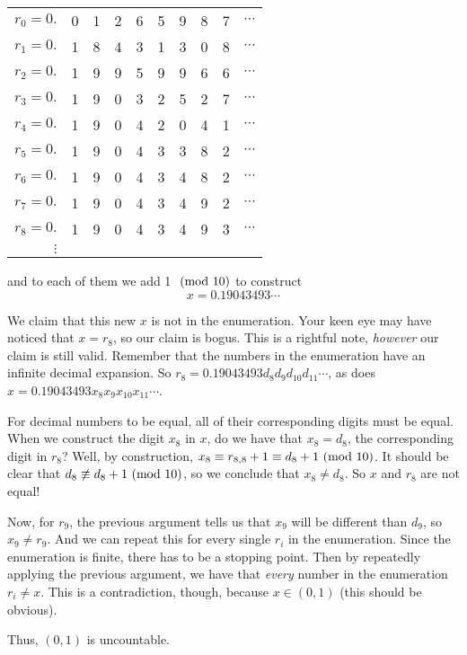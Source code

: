 \documentclass[main.tex]{subfiles}
\begin{document}
{	\begin{center}
		\begin{tabular}{rlllllllll}
			\(r_0 = 0.\) &\cellcolor{Melon}0 & 1 & 2 & 6 & 5 & 9 & 8 & 7 & \(\cdots\) \\
			\(r_1 = 0.\) & 1 &\cellcolor{Melon}8 & 4 & 3 & 1 & 3 & 0 & 8 & \(\cdots\) \\
			\(r_2 = 0.\) & 1 & 9 &\cellcolor{Melon}9 & 5 & 9 & 9 & 6 & 6 & \(\cdots\) \\
			\(r_3 = 0.\) & 1 & 9 & 0 &\cellcolor{Melon}3 & 2 & 5 & 2 & 7 & \(\cdots\) \\
			\(r_4 = 0.\) & 1 & 9 & 0 & 4 &\cellcolor{Melon}2 & 0 & 4 & 1 & \(\cdots\) \\
			\(r_5 = 0.\) & 1 & 9 & 0 & 4 & 3 &\cellcolor{Melon}3 & 8 & 2 & \(\cdots\) \\
			\(r_6 = 0.\) & 1 & 9 & 0 & 4 & 3 & 4 &\cellcolor{Melon}8 & 2 & \(\cdots\) \\
			\(r_7 = 0.\) & 1 & 9 & 0 & 4 & 3 & 4 & 9 &\cellcolor{Melon}2 & \(\cdots\) \\
			\(r_8 = 0.\) & 1 & 9 & 0 & 4 & 3 & 4 & 9 & 3 & \(\cdots\) \\
			\(\vdots\) \\
		\end{tabular}
	\end{center}
	
	and to each of them we add 1 \(\ (\mathrm{mod}\ 10)\) to construct \[x = 0.19043493\cdots\]
	
	We claim that this new \(x\) is not in the enumeration.
	Your keen eye may have noticed that \(x = r_8\), so our claim is bogus.
	This is a rightful note, \textit{however} our claim is still valid.
	Remember that the numbers in the enumeration have an infinite decimal expansion.
	So \(r_8 = 0.19043493 d_8 d_9 d_{10} d_{11} \cdots\), as does \(x = 0.19043493 x_8 x_9 x_{10} x_{11} \cdots\).
	
	For decimal numbers to be equal, all of their corresponding digits must be equal.
	When we construct the digit \(x_8\) in \(x\), do we have that \(x_8 = d_8\), the corresponding digit in \(r_8\)?
	Well, by construction, \(x_8 \equiv r_{8,8} + 1 \equiv d_8 + 1 \ (\mathrm{mod}\ 10)\).
	It should be clear that \(d_8 \not\equiv d_8 + 1 \ (\mathrm{mod}\ 10)\), so we conclude that \(x_8 \neq d_8\). So \(x\) and \(r_8\) are not equal!
	
	Now, for \(r_9\), the previous argument tells us that \(x_9\) will be different than \(d_9\), so \(x_9 \neq r_9\).
	And we can repeat this for every single \(r_i\) in the enumeration.
	Since the enumeration is finite, there has to be a stopping point.
	Then by repeatedly applying the previous argument, we have that \textit{every} number in the enumeration \(r_i \neq x\).
	This is a contradiction, though, because \(x \in (0,1)\) (this should be obvious).
	
	Thus, \((0,1)\) is uncountable.
}
\end{document}
